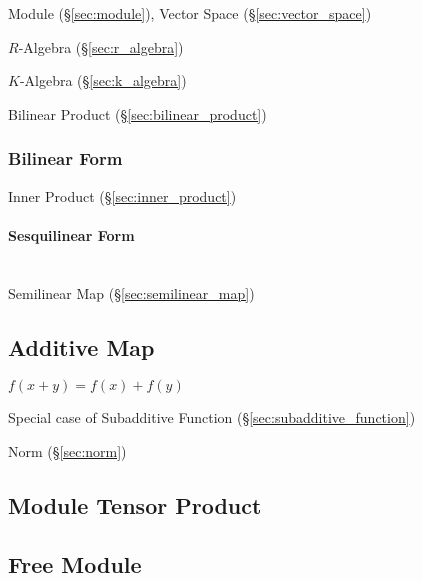 Module (\S\ref{sec:module}), Vector Space (\S\ref{sec:vector_space})

$R$-Algebra (\S\ref{sec:r_algebra})

$K$-Algebra (\S\ref{sec:k_algebra})

Bilinear Product (\S\ref{sec:bilinear_product})



\subsubsection{Bilinear Form}\label{sec:bilinear_form}

Inner Product (\S\ref{sec:inner_product})



\paragraph{Sesquilinear Form}\label{sec:sesquilinear_form}
\hfill \\

Semilinear Map (\S\ref{sec:semilinear_map})



\subsection{Additive Map}\label{sec:additive_map}

$f(x + y) = f(x) + f(y)$

Special case of Subadditive Function (\S\ref{sec:subadditive_function})

Norm (\S\ref{sec:norm})



\subsection{Module Tensor Product}\label{sec:module_tensor}

\subsection{Free Module}\label{sec:free_module}

